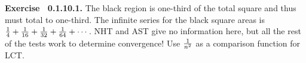 {\noindent \protect \bf  Exercise ~0.1.10.1.} The black region is one-third of the total square and thus must total to one-third. The infinite series for the black square areas is $\protect \frac  {1}{4}+\protect \frac  {1}{16}+\protect \frac  {1}{32}+\protect \frac  {1}{64}+\protect \cdots  $. NHT and AST give no information here, but all the rest of the tests work to determine convergence! Use $\protect \frac  {1}{n^2}$ as a comparison function for LCT. \protect \newline  \protect \newline  
